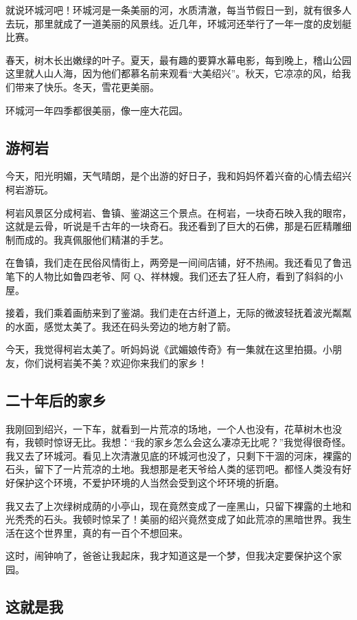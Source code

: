 \documentclass[UTF8,a4paper,titlepage,twoside,10.5pt]{article}
\begin{document}
就说环城河吧！环城河是一条美丽的河，水质清澈，每当节假日一到，就有很多人去玩，那里就成了一道美丽的风景线。近几年，环城河还举行了一年一度的皮划艇比赛。

春天，树木长出嫩绿的叶子。夏天，最有趣的要算水幕电影，每到晚上，稽山公园这里就人山人海，因为他们都慕名前来观看“大美绍兴”。秋天，它凉凉的风，给我们带来了快乐。冬天，雪花更美丽。

环城河一年四季都很美丽，像一座大花园。

\subsection{游柯岩}
\label{sec:org314fac3}

今天，阳光明媚，天气晴朗，是个出游的好日子，我和妈妈怀着兴奋的心情去绍兴柯岩游玩。

柯岩风景区分成柯岩、鲁镇、鉴湖这三个景点。在柯岩，一块奇石映入我的眼帘，这就是云骨，听说是千古年的一块奇石。我还看到了巨大的石佛，那是石匠精雕细制而成的。我真佩服他们精湛的手艺。

在鲁镇，我们走在民俗风情街上，两旁是一间间店铺，好不热闹。我还看见了鲁迅笔下的人物比如鲁四老爷、阿 Q、祥林嫂。我们还去了狂人府，看到了斜斜的小屋。

接着，我们乘着画舫来到了鉴湖。我们走在古纤道上，无际的微波轻抚着波光粼粼的水面，感觉太美了。我还在码头旁边的地方射了箭。

今天，我觉得柯岩太美了。听妈妈说《武媚娘传奇》有一集就在这里拍摄。小朋友，你们说柯岩美不美？欢迎你来我们的家乡！

\subsection{二十年后的家乡}
\label{sec:org6b55d7b}

我刚回到绍兴，一下车，就看到一片荒凉的场地，一个人也没有，花草树木也没有，我顿时惊讶无比。我想：“我的家乡怎么会这么凄凉无比呢？”我觉得很奇怪。我又去了环城河。看见上次清澈见底的环城河也没了，只剩下干涸的河床，裸露的石头，留下了一片荒凉的土地。我想那是老天爷给人类的惩罚吧。都怪人类没有好好保护这个环境，不爱护环境的人当然会受到这个坏环境的折磨。

我又去了上次绿树成荫的小亭山，现在竟然变成了一座黑山，只留下裸露的土地和光秃秃的石头。我顿时惊呆了！美丽的绍兴竟然变成了如此荒凉的黑暗世界。我生活在这个世界里，真的有一百个不想回来。

这时，闹钟响了，爸爸让我起床，我才知道这是一个梦，但我决定要保护这个家园。

\subsection{这就是我}
\label{sec:org827c0fb}
\end{document}
